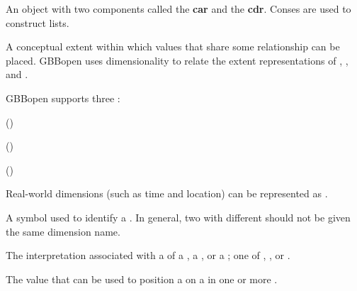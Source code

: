 \begin{glossary-list}

\glent[cons]
%
%
%
%
%
%
%
An object with two components called the \textbf{car} and the \textbf{cdr}.
Conses are used to construct lists.


\glent[dimension] 
%
%
A conceptual extent within which values that share some
relationship can be placed.  GBBopen uses dimensionality to relate the
extent representations of ,
, and .

GBBopen supports three :
\begin{tightenumerate}
\item {} ()
\item {} ()
\item {} ()
\end{tightenumerate}

Real-world dimensions (such as time and location) can be represented as
.


%
%
%
A symbol used to identify a .  In general, two
 with different  should not be given
the same dimension name.


%
%
%
%
%
The interpretation associated with a  of a
, a , or a ;
one of , , or .


%
%
%
The value that can be used to position a  on a
 in one or more .


\end{glossary-list}

